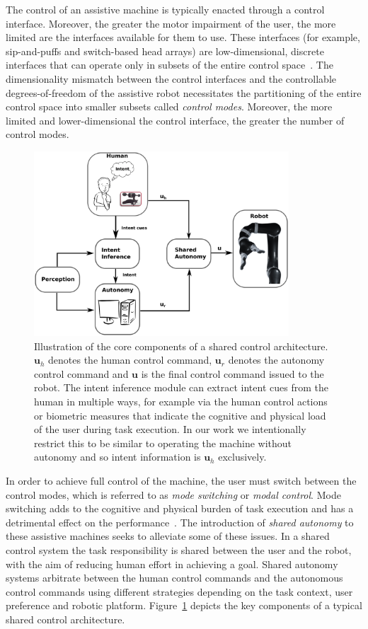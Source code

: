 \documentclass[natbib, twocolumn]{svjour3}          %
\begin{document}
The control of an assistive machine is typically enacted through a control interface. Moreover, the greater the motor impairment of the user, the more limited are the interfaces available for them to use. These interfaces (for example, sip-and-puffs and switch-based head arrays) are low-dimensional, discrete interfaces that can operate only in subsets of the entire control space~\citep{simpson2008tooth, nuttin2002selection}. 
The dimensionality mismatch between the control interfaces and the controllable degrees-of-freedom of the assistive robot necessitates the partitioning of the entire control space into smaller subsets called \textit{control modes}. Moreover, the more limited and lower-dimensional the control interface, the greater the number of control modes. 
\begin{figure}[t!]
	\includegraphics[keepaspectratio, width = 0.85\textwidth, center]{Fig1.eps}
	\caption{Illustration of the core components of a shared control architecture. $\boldsymbol{u}_h$ denotes the human control command, $\boldsymbol{u}_r$ denotes the autonomy control command and $\boldsymbol{u}$ is the final control command issued to the robot. The intent inference module can extract intent cues from the human in multiple ways, for example via the human control actions or biometric measures that indicate the cognitive and physical load of the user during task execution. In our work we intentionally restrict this to be similar to operating the machine without autonomy and so intent information is $\boldsymbol{u}_h$ exclusively. }
	\label{fig:shared_control}
\end{figure}
In order to achieve full control of the machine, the user must switch between the control modes, which is referred to as \textit{mode switching} or \textit{modal control}. Mode switching adds to the cognitive and physical burden of task execution and has a detrimental effect on the performance~\citep{eftring1999technical}. The introduction of \textit{shared autonomy} to these assistive machines seeks to alleviate some of these issues. In a shared control system the task responsibility is shared between the user and the robot, with the aim of reducing human effort in achieving a goal. Shared autonomy systems arbitrate between the human control commands and the autonomous control commands using different strategies depending on the task context, user preference and robotic platform. Figure~\ref{fig:shared_control} depicts the key components of a  typical shared control architecture.
\end{document}
